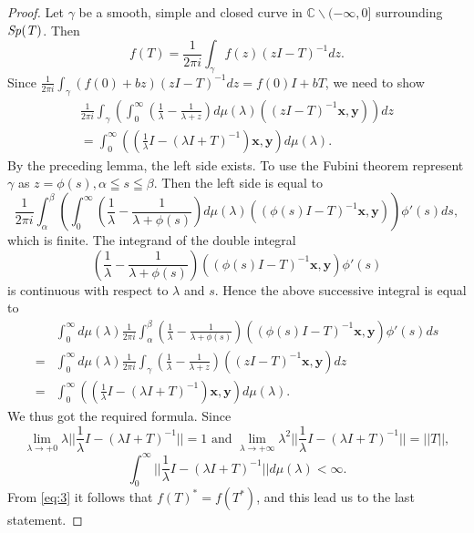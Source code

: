 \documentclass[reqno]{amsart}
\theoremstyle{definition}
\theoremstyle{remark}
\begin{document}
\begin{proof}
Let $\gamma$ be a smooth, simple and closed curve in $\mathbb{C} \smallsetminus (-\infty, 0]$ 
 surrounding $\it{Sp}(T)$. Then 
$$f(T) = \frac{1}{2\pi i} \int_{\gamma}  f(z) (z I - T)^{-1} dz.$$
Since $\frac{1}{2\pi i} \int_{\gamma}  (f(0) + b z) (z I - T)^{-1} dz = f(0) I  + b T$, we need to show 
\begin{gather*}
\frac{1}{2\pi i} \int_{\gamma} \left(\int_0^{\infty} (\frac{1}{\lambda } - \frac{1}{\lambda + z}) d\mu(\lambda) 
((z I - T)^{-1} \mathbf{x}, \mathbf{y})\right) dz\\
= \int_0^{\infty} ((\frac{1}{\lambda } I - (\lambda I  + T)^{-1}) \mathbf{x}, \mathbf{y})  d\mu(\lambda).
\end{gather*}
By the preceding lemma, the left side exists. To use the Fubini theorem
 represent $\gamma$ as 
$ z=\phi (s), \alpha \leqq s \leqq \beta$. Then the left side is equal to 
$$\frac{1}{2\pi i} \int_{\alpha}^{\beta} \left(\int_0^{\infty} (\frac{1}{\lambda} - \frac{1}{\lambda + \phi (s)})
d\mu(\lambda) 
((\phi (s) I - T)^{-1} \mathbf{x}, \mathbf{y}) \right) \phi'(s) d s,$$
which is finite. 
The integrand of the double integral 
$$(\frac{1}{\lambda} - \frac{1}{\lambda + \phi (s)}) ((\phi (s) I - T)^{-1} \mathbf{x}, \mathbf{y}) \phi'(s)$$
is continuous with respect to  $\lambda$ and $s$. Hence the above successive integral is equal to 
\begin{align*}
&\int_0^{\infty}d\mu(\lambda) 
\frac{1}{2\pi i} \int_{\alpha}^{\beta} (\frac{1}{\lambda} - \frac{1}{\lambda + \phi (s)}) ((\phi (s) I - T)^{-1}
 \mathbf{x}, \mathbf{y})  \phi'(s) d s\\
= & \int_0^{\infty}d\mu(\lambda) \frac{1}{2\pi i} \int_{\gamma} (\frac{1}{\lambda} 
- \frac{1}{\lambda + z})
 ((z I - T)^{-1} \mathbf{x}, \mathbf{y})  d z\\
=&  \int_0^{\infty}((\frac{1}{\lambda}I -
(\lambda I + T)^{-1}) \mathbf{x}, \mathbf{y}) d \mu(\lambda). 
\end{align*}
We thus got the required formula.  
Since 
$$\lim_{\lambda \to + 0} \lambda ||\frac{1}{\lambda} I - (\lambda I  + T)^{-1}|| = 1\, \, \text{and} \, \,
\lim_{\lambda \to + \infty} \lambda^2 ||\frac{1}{\lambda} I - (\lambda I  + T)^{-1}|| = || T||,$$ 
 $$\int_0^{\infty} ||\frac{1}{\lambda} I - (\lambda I  + T)^{-1}|| d\mu(\lambda)
<\infty.$$
From \eqref{eq:3} it follows that $f(T)^* = f(T^*)$, and this lead us to the last statement.
\end{proof}
\end{document}

